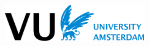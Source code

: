 \begin{titlepage}
    \begin{addmargin}[-1cm]{-3cm}
    \begin{center}
        \large

        \hfill

        \vfill

        \begingroup
            \color{Maroon}\spacedallcaps{\myTitle} \\
            \spacedlowsmallcaps{\mySubtitle} \\
            \bigskip
        \endgroup

        \spacedlowsmallcaps{\myName}

        \vfill

        \includegraphics[width=6cm]{figures/VU_logo.png} \\ \medskip

        \medskip
        \myDegree \\
        \myDepartment \\
        \myFaculty \\
        \myUni \\ \bigskip

        \myTime

        \vfill

    \end{center}
  \end{addmargin}
\end{titlepage}
